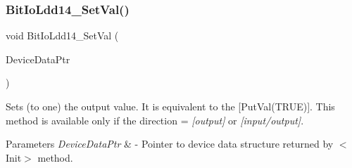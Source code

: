 \subsubsection{\texorpdfstring{Bit\+Io\+Ldd14\+\_\+\+Set\+Val()}{BitIoLdd14\_SetVal()}}
{\footnotesize\ttfamily void Bit\+Io\+Ldd14\+\_\+\+Set\+Val (\begin{DoxyParamCaption}\item[{\hyperlink{group___p_e___types__module_gac5cf1362f1f0e3a2ce71b1bf2276d091}{L\+D\+D\+\_\+\+T\+Device\+Data} $\ast$}]{Device\+Data\+Ptr }\end{DoxyParamCaption})}



Sets (to one) the output value. It is equivalent to the \mbox{[}Put\+Val(\+T\+R\+U\+E)\mbox{]}. This method is available only if the direction = {\itshape \mbox{[}output\mbox{]}} or {\itshape \mbox{[}input/output\mbox{]}}. 


\begin{DoxyParams}{Parameters}
{\em Device\+Data\+Ptr} & -\/ Pointer to device data structure returned by $<$\+Init$>$ method. \\
\hline
\end{DoxyParams}
